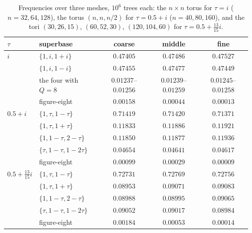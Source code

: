 \documentclass[11pt]{amsart}
\theoremstyle{definition}
\theoremstyle{remark}
\begin{document}
\begin{table}[tbp]
\centering
\small
\begin{tabular}{llccc}
\toprule
$\tau$ & superbase & coarse & middle & fine\\\midrule
$i$ & $\{1,i,1+i\}$ & $0.47405$ & $0.47486$ & $0.47527$\\
 & $\{1,i,1-i\}$ & $0.47455$ & $0.47477$ & $0.47449$\\
 & the four with $Q=8$ & $0.01237$--$0.01256$ & $0.01239$--$0.01259$ & $0.01245$--$0.01258$\\
 & figure-eight & $0.00158$ & $0.00044$ & $0.00013$\\
$0.5+i$ & $\{1,\tau,1-\tau\}$ & $0.71419$ & $0.71420$ & $0.71371$\\
 & $\{1,\tau,1+\tau\}$ & $0.11833$ & $0.11886$ & $0.11921$\\
 & $\{1,1-\tau,2-\tau\}$ & $0.11850$ & $0.11877$ & $0.11936$\\
 & $\{\tau,1-\tau,1-2\tau\}$ & $0.04654$ & $0.04641$ & $0.04617$\\
 & figure-eight & $0.00099$ & $0.00029$ & $0.00009$\\
$0.5+\tfrac{13}{15}i$ & $\{1,\tau,1-\tau\}$ & $0.72731$ & $0.72769$ & $0.72756$\\
 & $\{1,\tau,1+\tau\}$ & $0.08953$ & $0.09071$ & $0.09083$\\
 & $\{1,1-\tau,2-\tau\}$ & $0.08988$ & $0.08995$ & $0.09065$\\
 & $\{\tau,1-\tau,1-2\tau\}$ & $0.09052$ & $0.09017$ & $0.08984$\\
 & figure-eight & $0.00184$ & $0.00053$ & $0.00014$\\\bottomrule
\end{tabular}
\medskip
\caption{Frequencies over three meshes, $10^6$ trees each: the $n\times n$ torus for $\tau=i$ ($n=32,64,128$), the
torus $(n,n,n/2)$ for $\tau=0.5+i$ ($n=40,80,160$), and the tori $(30,26,15)$, $(60,52,30)$, $(120,104,60)$ for
$\tau=0.5+\tfrac{13}{15}i$.}
\label{tab:ladder}
\end{table}
\end{document}
